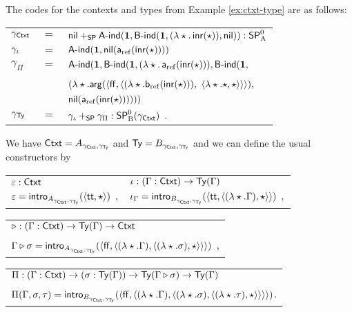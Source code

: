 \documentclass{article}
\begin{document}
\begin{description}
The codes for the contexts and types from Example \ref{ex:ctxt-type} are as follows: \vskip
0.2cm
\begin{tabular}{lcl}
$\gamma_{\mathsf{Ctxt}}$ &$=$& $\mathsf{nil} +_{\mathsf{SP}} \mathsf{A}\text{-}\mathsf{ind}(\mathbf{1}, \mathsf{B}\text{-}\mathsf{ind}(\mathbf{1}, (\lambda \star .\,\mathsf{inr}(\star)),
\mathsf{nil})) : \mathsf{SP}^{0}_{\mathrm{A}}$ \\
$\gamma_{\iota}$ &$=$& $\mathsf{A}\text{-}\mathsf{ind}(\mathbf{1}, \mathsf{nil}(\mathsf{a}_{\mathrm{ref}}(\mathsf{inr}(\star))))$ \\
$\gamma_{\Pi}$ &$=$& $\mathsf{A}\text{-}\mathsf{ind}(\mathbf{1}, \mathsf{B}\text{-}\mathsf{ind}(\mathbf{1}, (\lambda \star.\,\mathsf{a}_{\mathrm{ref}}(\mathsf{inr}(\star))),\mathsf{B}\text{-}\mathsf{ind}(\mathbf{1},$ \\
&& \qquad\quad $(\lambda \star.\mathsf{arg}(\langle \mathsf{ff}, \langle (\lambda
\star.\mathsf{b}_{\mathrm{ref}}(\mathsf{inr}(\star))),$ 
 $\langle \lambda \star.\star, \star\rangle\rangle\rangle),$ \\
&& \qquad\qquad $\mathsf{nil}(\mathsf{a}_{\mathrm{ref}}(\mathsf{inr}(\star))))))$ \\
$\gamma_{\mathsf{Ty}}$ &$=$& $\gamma_{\iota} +_{\mathsf{SP}} \gamma_{\Pi} : \mathsf{SP}^{0}_{\mathrm{B}}(\gamma_{\mathsf{Ctxt}})\enspace .$
\end{tabular}
\vskip 0.2cm \noindent
We have $\mathsf{Ctxt} = A_{\gamma_{\mathsf{Ctxt}}, \gamma_{\mathsf{Ty}}}$ and $\mathsf{Ty} =
B_{\gamma_{\mathsf{Ctxt}}, \gamma_{\mathsf{Ty}}}$
and we can define the usual constructors by
\vskip 0.2cm
\begin{tabular}{l@{\qquad\qquad}l}
  $\varepsilon : \mathsf{Ctxt}$ & $\iota : (\Gamma : \mathsf{Ctxt}) \to \mathsf{Ty}(\Gamma)$ \\
  $\varepsilon = \mathsf{intro}_{A_{\gamma_{\mathsf{Ctxt}}, \gamma_{\mathsf{Ty}}}}(\langle \mathsf{tt}, \star\rangle)\enspace ,$ & $\iota_{\Gamma} = \mathsf{intro}_{B_{\gamma_{\mathsf{Ctxt}}, \gamma_{\mathsf{Ty}}}}(\langle \mathsf{tt}, \langle (\lambda \star.\Gamma), \star\rangle\rangle)\enspace ,$\!\!\!\\
\end{tabular}
\vskip 0.2cm
\begin{tabular}{l}
  $\triangleright : (\Gamma : \mathsf{Ctxt}) \to \mathsf{Ty}(\Gamma) \to \mathsf{Ctxt}$ \\
  $\Gamma \triangleright \sigma = \mathsf{intro}_{A_{\gamma_{\mathsf{Ctxt}}, \gamma_{\mathsf{Ty}}}}(\langle \mathsf{ff}, \langle (\lambda \star.\Gamma), \langle (\lambda \star.\sigma), \star\rangle \rangle\rangle)$ \enspace ,\\
\end{tabular}
\vskip 0.2cm
\begin{tabular}{l}
$\Pi : (\Gamma : \mathsf{Ctxt}) \to (\sigma : \mathsf{Ty}(\Gamma)) \to \mathsf{Ty}(\Gamma \triangleright \sigma) \to
\mathsf{Ty}(\Gamma)$ \\
$\Pi(\Gamma, \sigma, \tau) = \mathsf{intro}_{B_{\gamma_{\mathsf{Ctxt}}, \gamma_{\mathsf{Ty}}}}(\langle \mathsf{ff}, \langle (\lambda
    \star.\Gamma), \langle (\lambda \star.\sigma),\langle (\lambda \star. \tau) , \star\rangle\rangle \rangle\rangle)$\enspace .
\end{tabular}


\end{description}
\end{document}

